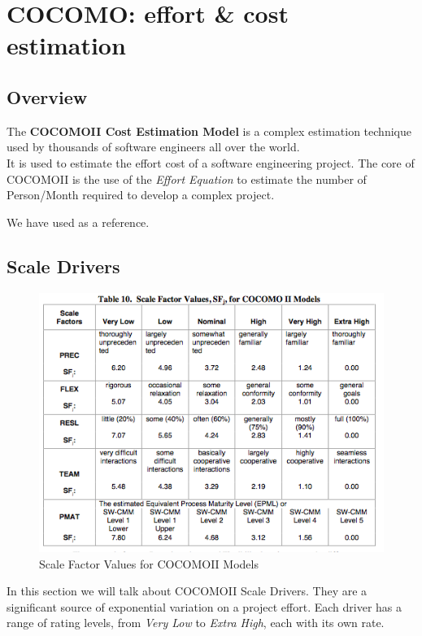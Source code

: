 \section{COCOMO\rr: effort \& cost estimation}
\label{sec:cocomo}
\subsection{Overview} %
\label{sub:cocomo_overview}
The \textbf{COCOMO\rr II Cost Estimation Model} is a complex estimation technique used 
by thousands of software engineers all over the world. \\
It is used to estimate the effort cost of a software engineering project.
The core of COCOMO\rr II is the use of the \emph{Effort Equation} to estimate the number
of Person/Month required to develop a complex project.

We have used \cite{bib:cocomo} as a reference.

\subsection{Scale Drivers} %
\label{sub:scale_drivers}
\begin{figure}[h]
    \includegraphics[trim={0.23cm 0.2cm 0.43cm 0.55cm},clip,width=\linewidth]{img/scaledriver.png}
    \caption{Scale Factor Values for COCOMO\rr II Models}
    \label{tbl:scale}
\end{figure}

\pagebreak 
In this section we will talk about COCOMO\rr II Scale Drivers. 
They are a significant source of exponential variation on a project effort. 
Each driver has a range of rating levels, from \emph{Very Low} to 
\emph{Extra High}, each with its own rate. 


